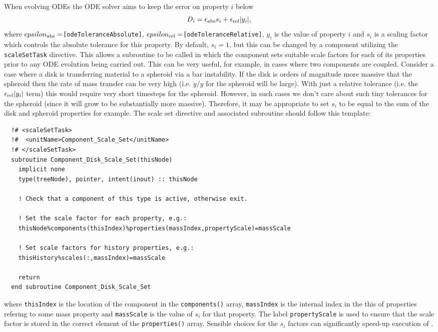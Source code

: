 When evolving ODEs the ODE solver aims to keep the error on property $i$ below
\begin{equation}
 D_i = \epsilon_{\rm abs} s_i + \epsilon_{\rm rel} |y_i|,
\end{equation}
where $epsilon_{\rm abs}=${\tt [odeToleranceAbsolute]}, $epsilon_{\rm rel}=${\tt [odeToleranceRelative]}, $y_i$ is the value of property $i$ and $s_i$ is a scaling factor which controls the absolute tolerance for this property. By default, $s_i=1$, but this can be changed by a component utilizing the {\tt scaleSetTask} directive. This allows a subroutine to be called in which the component sets suitable scale factors for each of its properties prior to any ODE evolution being carried out. This can be very useful, for example, in cases where two components are coupled. Consider a case where a disk is transferring material to a spheroid via a bar instability. If the disk is orders of magnitude more massive that the spheroid then the rate of mass transfer can be very high (i.e. $\dot{y}/y$ for the spheroid will be large). With just a relative tolerance (i.e. the $\epsilon_{\rm rel} |y_i|$ term) this would require very short timesteps for the spheroid. However, in such cases we don't care about such tiny tolerances for the spheroid (since it will grow to be substantially more massive). Therefore, it may be appropriate to set $s_i$ to be equal to the sum of the disk and spheroid properties for example. The scale set directive and associated subroutine should follow this template:
\begin{verbatim}
  !# <scaleSetTask>
  !#  <unitName>Component_Scale_Set</unitName>
  !# </scaleSetTask>
  subroutine Component_Disk_Scale_Set(thisNode)
    implicit none
    type(treeNode), pointer, intent(inout) :: thisNode

    ! Check that a component of this type is active, otherwise exit.

    ! Set the scale factor for each property, e.g.:
    thisNode%components(thisIndex)%properties(massIndex,propertyScale)=massScale

    ! Set scale factors for history properties, e.g.:
    thisHistory%scales(:,massIndex)=massScale

    return
  end subroutine Component_Disk_Scale_Set
\end{verbatim}
where {\tt thisIndex} is the location of the component in the {\tt components()} array, {\tt massIndex} is the internal index in the this of properties refering to some mass property and {\tt massScale} is the value of $s_i$ for that property. The label {\tt propertyScale} is used to ensure that the scale factor is stored in the correct element of the {\tt properties()} array. Sensible choices for the $s_i$ factors can significantly speed-up execution of \glc.

